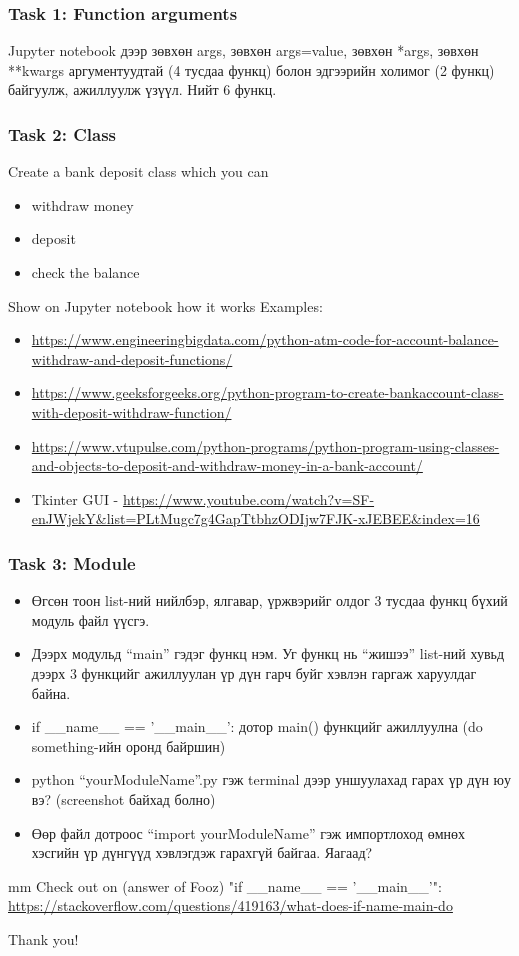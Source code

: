 \documentclass{beamer}
\begin{document}
\begin{frame}
    \frametitle{Task 1: Function arguments}
    Jupyter notebook дээр зөвхөн args, зөвхөн args=value, зөвхөн *args, 
    зөвхөн **kwargs аргументуудтай (4 тусдаа функц) болон эдгээрийн холимог 
    (2 функц) байгуулж, ажиллуулж үзүүл. Нийт 6 функц.
\end{frame}

\begin{frame}
    \frametitle{Task 2: Class}
    Create a bank deposit class which you can 
    \begin{itemize}
        \item withdraw money
        \item deposit 
        \item check the balance
    \end{itemize}
    Show on Jupyter notebook how it works
\vskip 2mm
Examples: 
\tiny
    \begin{itemize}
        \item \url{https://www.engineeringbigdata.com/python-atm-code-for-account-balance-withdraw-and-deposit-functions/}
        \item \url{https://www.geeksforgeeks.org/python-program-to-create-bankaccount-class-with-deposit-withdraw-function/}
        \item \url{https://www.vtupulse.com/python-programs/python-program-using-classes-and-objects-to-deposit-and-withdraw-money-in-a-bank-account/}
        \item Tkinter GUI - \url{https://www.youtube.com/watch?v=SF-enJWjekY&list=PLtMugc7g4GapTtbhzODIjw7FJK-xJEBEE&index=16}
    \end{itemize}
\end{frame}

\begin{frame}
    \frametitle{Task 3: Module}   
\tiny
    \begin{itemize}
        \item Өгсөн тоон list-ний нийлбэр, ялгавар, үржвэрийг олдог 3 тусдаа функц бүхий модуль файл үүсгэ. 
        \item Дээрх модульд “main” гэдэг функц нэм. Уг функц нь “жишээ” list-ний хувьд дээрх 3 функцийг ажиллуулан үр дүн гарч буйг хэвлэн гаргаж харуулдаг байна.
        \item if {\_\_name\_\_ == '\_\_main\_\_'}: дотор main() функцийг ажиллуулна (do something-ийн оронд байршин)
        \item python  “yourModuleName”.py гэж terminal дээр уншуулахад гарах үр дүн юу вэ? (screenshot байхад болно)
        \item Өөр файл дотроос “import yourModuleName” гэж импортлоход өмнөх хэсгийн үр дүнгүүд хэвлэгдэж гарахгүй байгаа. Яагаад?        
    \end{itemize}

 mm
    Check out on (answer of Fooz) "if \_\_name\_\_ == '\_\_main\_\_'": \\
    \url{https://stackoverflow.com/questions/419163/what-does-if-name-main-do}

\end{frame}

\begin{frame}
\Huge{\centerline{Thank you!}}
\end{frame}

\end{document}
